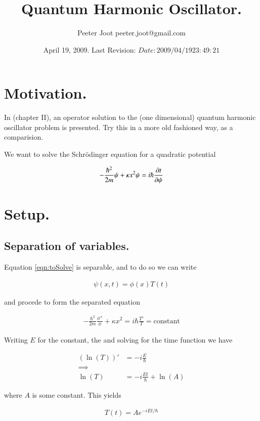 \documentclass{article}
\title{ Quantum Harmonic Oscillator. }
\author{Peeter Joot \quad peeter.joot@gmail.com }
\date{ April 19, 2009.  Last Revision: $Date: 2009/04/19 23:49:21 $ }
\begin{document}
\maketitle{}
\tableofcontents
\section{ Motivation. }

In \cite{byron1992mca} (chapter II), an operator solution to the
(one dimensional) quantum
harmonic oscillator problem is presented.  Try this in a more old fashioned way,
as a comparision.

We want to solve the Schr\"{o}dinger equation for a quadratic potential

\begin{align}\label{eqn:toSolve}
-\frac{\hbar^2}{2m} \psi + \kappa x^2 \psi = i \hbar \frac{\partial{t}}{\partial {\psi}}
\end{align}

\section{ Setup. }

\subsection{ Separation of variables. }

Equation \ref{eqn:toSolve} is separable, and to do so we can write

\begin{align*}
\psi(x,t) = \phi(x) T(t)
\end{align*}

and procede to form the separated equation

\begin{align*}
-\frac{\hbar^2}{2m} \frac{\phi''}{\phi} + \kappa x^2 = i \hbar \frac{T'}{T} = \text{constant}
\end{align*}

Writing $E$ for the constant, the and solving for the time function we have

\begin{align*}
(\ln(T))' &= -i \frac{E}{\hbar} \\
\implies \\
\ln(T) &= -i \frac{Et}{\hbar} + \ln(A)
\end{align*}

where $A$ is some constant.  This yields

\begin{align*}
T(t) = A e^{ -i E t/\hbar }
\end{align*}
\end{document}
